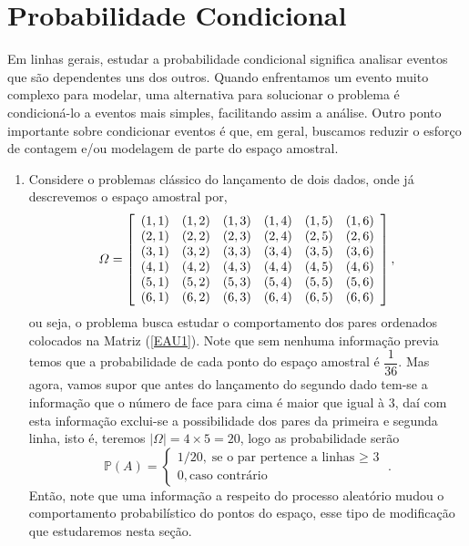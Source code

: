 \section{Probabilidade Condicional}
    
 Em linhas gerais, estudar a probabilidade condicional significa analisar eventos que são dependentes uns dos outros. Quando enfrentamos um evento muito complexo para modelar, uma alternativa para solucionar o problema é condicioná-lo a eventos mais simples, facilitando assim a análise. Outro ponto importante sobre condicionar eventos é que, em geral, buscamos reduzir o esforço de contagem e/ou modelagem de parte do espaço amostral.


\exemplo
\begin{enumerate}
    \item [(i)] Considere o problemas clássico do lançamento de dois dados, onde já descrevemos o espaço amostral por,
\begin{equation}
    \label{EAU1}
	\mathnormal{\Omega}=\left[
	\begin{array}{cccccc}
	(1,1) & (1,2) & (1,3)& (1,4)&(1,5)&(1,6)\\
	(2,1) & (2,2) & (2,3)& (2,4)&(2,5)&(2,6)\\
	(3,1) & (3,2) & (3,3)& (3,4)&(3,5)&(3,6)\\
	(4,1) & (4,2) & (4,3)& (4,4)&(4,5)&(4,6)\\
	(5,1) & (5,2) & (5,3)& (5,4)&(5,5)&(5,6)\\
	(6,1) & (6,2) & (6,3)& (6,4)&(6,5)&(6,6)\\
	\end{array}
	\right],
\end{equation}
ou seja, o problema busca estudar o comportamento dos pares ordenados  colocados na Matriz (\ref{EAU1}). Note que sem nenhuma informação previa temos que a probabilidade de cada ponto do espaço amostral é $\dfrac{1}{36}$. Mas agora, vamos supor que antes do lançamento do segundo dado tem-se a informação que o número de face para cima é maior que igual à 3, daí com esta informação exclui-se a possibilidade dos pares da primeira e segunda linha, isto é, teremos $|\Omega| = 4 \times 5 = 20$, logo as probabilidade serão
\begin{equation}
    \mathbb{P}(A) = \begin{cases}
    1/20, \text{se o par pertence a linhas  $\geq$ 3}\\
    0, \text{caso contrário}
    \end{cases}.
\end{equation}
\inic Então, note que uma informação a respeito do processo aleatório mudou o comportamento probabilístico do pontos do espaço, esse tipo de modificação que estudaremos nesta seção.
\end{enumerate}	
